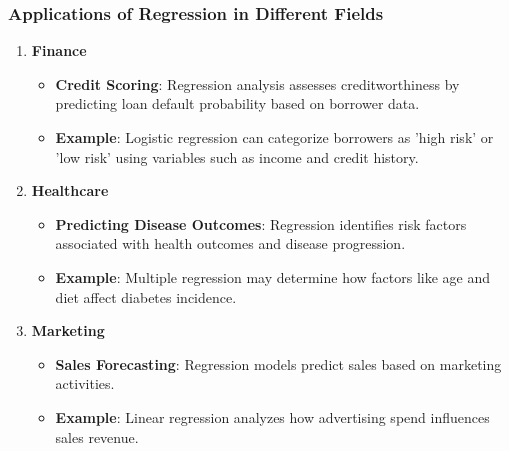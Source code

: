 \documentclass[aspectratio=169]{beamer}
\begin{document}
\begin{frame}[fragile]
    \frametitle{Applications of Regression in Different Fields}
    \begin{enumerate}
        \item \textbf{Finance}
            \begin{itemize}
                \item \textbf{Credit Scoring}: Regression analysis assesses creditworthiness by predicting loan default probability based on borrower data.
                \item \textbf{Example}: Logistic regression can categorize borrowers as 'high risk' or 'low risk' using variables such as income and credit history.
            \end{itemize}

        \item \textbf{Healthcare}
            \begin{itemize}
                \item \textbf{Predicting Disease Outcomes}: Regression identifies risk factors associated with health outcomes and disease progression.
                \item \textbf{Example}: Multiple regression may determine how factors like age and diet affect diabetes incidence.
            \end{itemize}

        \item \textbf{Marketing}
            \begin{itemize}
                \item \textbf{Sales Forecasting}: Regression models predict sales based on marketing activities.
                \item \textbf{Example}: Linear regression analyzes how advertising spend influences sales revenue.
            \end{itemize}
    \end{enumerate}
\end{frame}
\end{document}
